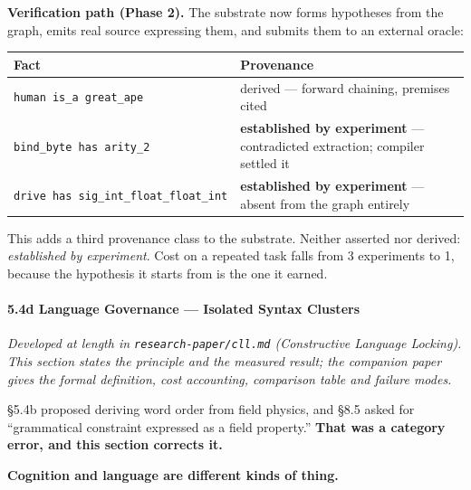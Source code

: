 \documentclass[
  11pt,
  a4paper,
]{article}
\begin{document}
\textbf{Verification path (Phase 2).} The substrate now forms hypotheses
from the graph, emits real source expressing them, and submits them to
an external oracle:

\begin{longtable}[]{@{}
  >{\raggedright\arraybackslash}p{}
  >{\raggedright\arraybackslash}p{}@{}}
\toprule\noalign{}
\begin{minipage}[b]{\linewidth}\raggedright
Fact
\end{minipage} & \begin{minipage}[b]{\linewidth}\raggedright
Provenance
\end{minipage} \\
\midrule\noalign{}
\endhead
\bottomrule\noalign{}
\endlastfoot
\texttt{human\ is\_a\ great\_ape} & derived --- forward chaining,
premises cited \\
\texttt{bind\_byte\ has\ arity\_2} & \textbf{established by experiment}
--- contradicted extraction; compiler settled it \\
\texttt{drive\ has\ sig\_int\_float\_float\_int} & \textbf{established
by experiment} --- absent from the graph entirely \\
\end{longtable}

This adds a third provenance class to the substrate. Neither asserted
nor derived: \emph{established by experiment}. Cost on a repeated task
falls from 3 experiments to 1, because the hypothesis it starts from is
the one it earned.

\paragraph{5.4d Language Governance --- Isolated Syntax
Clusters}\label{d-language-governance-isolated-syntax-clusters}

\emph{Developed at length in \texttt{research-paper/cll.md}
(Constructive Language Locking). This section states the principle and
the measured result; the companion paper gives the formal definition,
cost accounting, comparison table and failure modes.}

§5.4b proposed deriving word order from field physics, and §8.5 asked
for ``grammatical constraint expressed as a field property.''
\textbf{That was a category error, and this section corrects it.}

\textbf{Cognition and language are different kinds of thing.}
\end{document}
